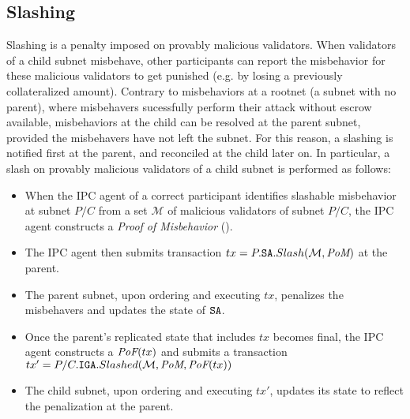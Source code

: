 \subsection{Slashing}
\label{sec:slash}
Slashing is a penalty imposed on provably malicious validators. When validators of a child subnet misbehave, other participants can report the misbehavior for these malicious validators to get punished (e.g. by losing a previously collateralized amount). Contrary to misbehaviors at a rootnet (a subnet with no parent), where misbehavers sucessfully perform their attack without escrow available, misbehaviors at the child can be resolved at the parent subnet, provided the misbehavers have not left the subnet. For this reason, a slashing is notified first at the parent, and reconciled at the child later on. In particular, a slash on provably malicious validators of a child subnet is performed as follows:
\begin{itemize}
    \item When the IPC agent of a correct participant identifies slashable misbehavior at subnet $P/C$ from a set $\mathcal{M}$ of malicious validators of subnet $P/C$, the IPC agent constructs a \textit{Proof of Misbehavior} (\pom). \item The IPC agent then submits transaction $tx=P.\texttt{SA}.Slash(\mathcal{M}, \textit{PoM})$ at the parent.
    \item The parent subnet, upon ordering and executing $tx$, penalizes the misbehavers and updates the state of $\texttt{SA}$.
    \item Once the parent's replicated state that includes $tx$ becomes final, the IPC agent constructs a $\textit{PoF}(tx)$ and submits a transaction $tx'=P/C.\texttt{IGA}.Slashed(\mathcal{M}, \textit{PoM}, \textit{PoF}(tx))$ 
    \item The child subnet, upon ordering and executing $tx'$, updates its state to reflect the penalization at the parent. 
\end{itemize}
